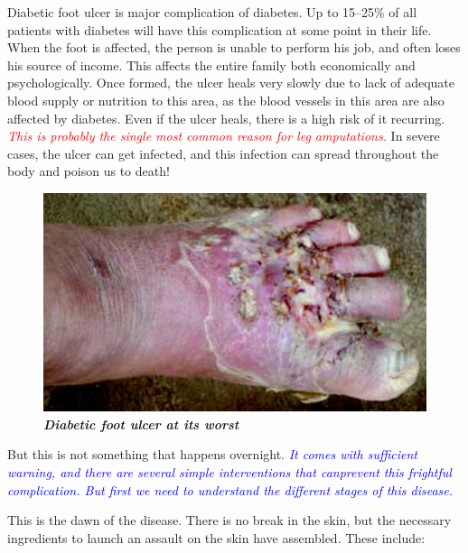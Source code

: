 Diabetic foot ulcer is major compli\-cation of diabetes. Up to 15–25\% of all patients with diabetes will have this complication at some point in their life. When the foot is affected, the person is unable to perform his job, and often loses his source of income. This affects the entire family both economically and psychologically. Once formed, the ulcer heals very slowly due to lack of adequate blood supply or nutrition to this area, as the blood vessels in this area are also affected by diabetes. Even if the ulcer heals, there is a high risk of it recurring. \textcolor{red}{\textit{This is probably the single most common reason for leg amputations.}} In severe cases, the ulcer can get infected, and this infection can spread throughout the body and poison us to death!

\begin{figure}[h]
\centering
\includegraphics[scale=1.2]{images/059.jpg}\\
\textbf{\textit{Diabetic foot ulcer at its worst}}
\end{figure}

But this is not something that happens overnight. \textcolor{blue}{\textit{It comes with suffi\-cient warning, and there are several simple interventions that can\break prevent this frightful complication. But first we need to understand the diffe\-rent stages of this disease.}}


This is the dawn of the disease. There is no break in the skin, but the necessary ingredients to launch an assault on the skin have assembled. These include:

